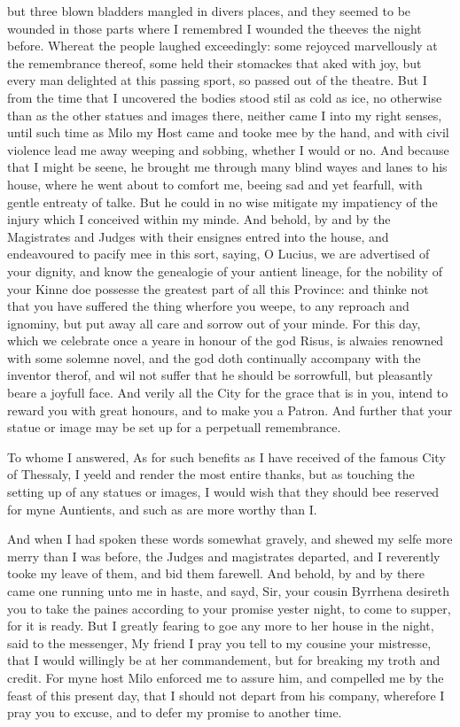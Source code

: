 but three blown bladders mangled in divers places, and they seemed to be
wounded in those parts where I remembred I wounded the theeves the night
before. Whereat the people laughed exceedingly: some rejoyced marvellously at
the remembrance thereof, some held their stomackes that aked with joy, but
every man delighted at this passing sport, so passed out of the theatre. But I
from the time that I uncovered the bodies stood stil as cold as ice, no
otherwise than as the other statues and images there, neither came I into my
right senses, until such time as Milo my Host came and tooke mee by the hand,
and with civil violence lead me away weeping and sobbing, whether I would or
no. And because that I might be seene, he brought me through many blind wayes
and lanes to his house, where he went about to comfort me, beeing sad and yet
fearfull, with gentle entreaty of talke. But he could in no wise mitigate my
impatiency of the injury which I conceived within my minde. And behold, by and
by the Magistrates and Judges with their ensignes entred into the house, and
endeavoured to pacify mee in this sort, saying, O Lucius, we are advertised of
your dignity, and know the genealogie of your antient lineage, for the nobility
of your Kinne doe possesse the greatest part of all this Province: and thinke
not that you have suffered the thing wherfore you weepe, to any reproach and
ignominy, but put away all care and sorrow out of your minde. For this day,
which we celebrate once a yeare in honour of the god Risus, is alwaies renowned
with some solemne novel, and the god doth continually accompany with the
inventor therof, and wil not suffer that he should be sorrowfull, but
pleasantly beare a joyfull face. And verily all the City for the grace that is
in you, intend to reward you with great honours, and to make you a Patron. And
further that your statue or image may be set up for a perpetuall remembrance.

To whome I answered, As for such benefits as I have received of the famous City
of Thessaly, I yeeld and render the most entire thanks, but as touching the
setting up of any statues or images, I would wish that they should bee reserved
for myne Auntients, and such as are more worthy than I.

And when I had spoken these words somewhat gravely, and shewed my selfe more
merry than I was before, the Judges and magistrates departed, and I reverently
tooke my leave of them, and bid them farewell. And behold, by and by there came
one running unto me in haste, and sayd, Sir, your cousin Byrrhena desireth you
to take the paines according to your promise yester night, to come to supper,
for it is ready. But I greatly fearing to goe any more to her house in the
night, said to the messenger, My friend I pray you tell to my cousine your
mistresse, that I would willingly be at her commandement, but for breaking my
troth and credit. For myne host Milo enforced me to assure him, and compelled
me by the feast of this present day, that I should not depart from his company,
wherefore I pray you to excuse, and to defer my promise to another time.

